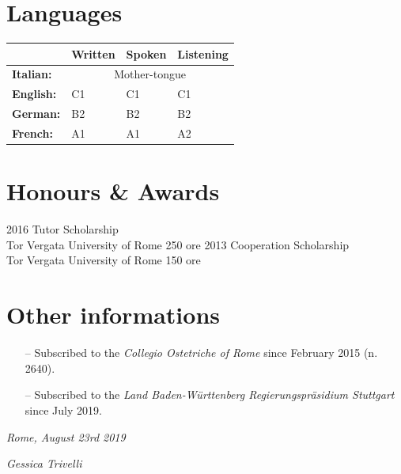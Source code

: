 \documentclass[11pt]{friggeri-cv}
\begin{document}
\section{Languages}
\begin{table}[!h]
  \centering
  \renewcommand{\arraystretch}{1.45}
  \begin{tabular}{ p{3cm} p{3cm} p{3cm} p{3cm} }
    \hline
      & \textbf{Written}  
      & \textbf{Spoken} 
      & \textbf{Listening} \\ 
    \hline
    \textbf{Italian:}   
      & \multicolumn{3}{c}{Mother-tongue} \\
    \textbf{English:}
      & C1 
      & C1 
      & C1 \\ 
    \textbf{German:} 
      & B2 
      & B2 
      & B2 \\ 
    \textbf{French:} 
      & A1 
      & A1 
      & A2 \\
    \hline
  \end{tabular}
\end{table}

\newpage
\section{Honours \& Awards}
\begin{entrylist}
  \entry
    {2016}
    {Tutor Scholarship}
    {\\Tor Vergata University of Rome}
    {250 ore}
  \entry
    {2013}
    {Cooperation Scholarship}
    {\\Tor Vergata University of Rome}
    {150 ore}
\end{entrylist}

\section{Other informations}
\begin{itemize}
  \item[--] Subscribed to the \textit{Collegio Ostetriche of Rome} since 
  February 2015 (n. 2640).
  \item[--] Subscribed to the \emph{Land Baden-W{\"u}rttenberg 
    Regierungspr{\"a}sidium Stuttgart} since July 2019.
\end{itemize}


\vspace{3.5cm}
\begin{flushleft}
  \large\emph{Rome, August 23rd 2019}
\end{flushleft}
\begin{flushright}
  \large\emph{Gessica Trivelli}
\end{flushright}
\end{document}
